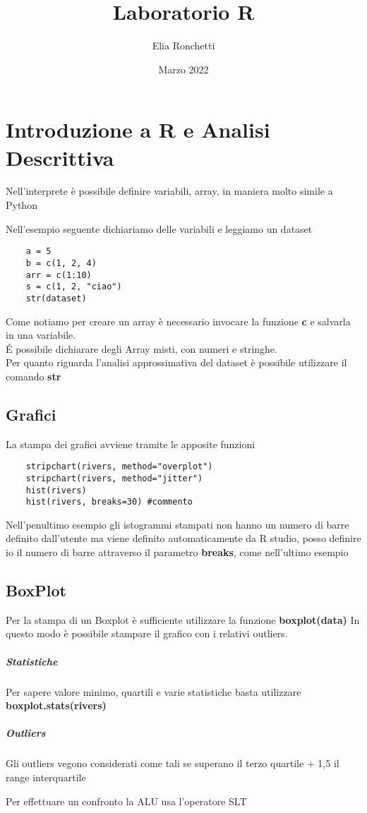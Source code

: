 \documentclass[12pt, a4paper, openany]{book}
\begin{document}
\title{Laboratorio R}
\author{Elia Ronchetti}
\date{Marzo 2022}

\maketitle
\tableofcontents
\chapter{Introduzione a R e Analisi Descrittiva}
Nell'interprete è possibile definire variabili, array, in maniera molto simile
a Python

Nell'esempio seguente dichiariamo delle variabili e leggiamo un dataset
\begin{lstlisting}
    a = 5
    b = c(1, 2, 4)
    arr = c(1:10)
    s = c(1, 2, "ciao")
    str(dataset)
\end{lstlisting}


Come notiamo per creare un array è necessario invocare la funzione \textbf{c} e salvarla in una variabile.
\\ \'E possibile dichiarare degli Array misti, con numeri e stringhe.
\\ Per quanto riguarda l'analisi approssimativa del dataset è possibile utilizzare il
comando \textbf{str}

\section{Grafici}
La stampa dei grafici avviene tramite le apposite funzioni
\begin{lstlisting}
    stripchart(rivers, method="overplot")
    stripchart(rivers, method="jitter")
    hist(rivers)
    hist(rivers, breaks=30) #commento
\end{lstlisting}
Nell'penultimo esempio gli istogrammi stampati non hanno un numero di barre definito dall'utente
ma viene definito automaticamente da R studio, posso definire io il numero di barre attraverso
il parametro \textbf{breaks}, come nell'ultimo esempio 

\section{BoxPlot}
Per la stampa di un Boxplot è sufficiente utilizzare la funzione \textbf{boxplot(data)}
In questo modo è possibile stampare il grafico con i relativi outliers.
\paragraph{Statistiche} Per sapere valore minimo, quartili e varie statistiche basta utilizzare
\textbf{boxplot.stats(rivers)}
\paragraph{Outliers} Gli outliers vegono considerati come tali se superano il terzo quartile
+ 1,5 il range interquartile

Per effettuare un confronto la ALU usa l'operatore SLT
\end{document}
